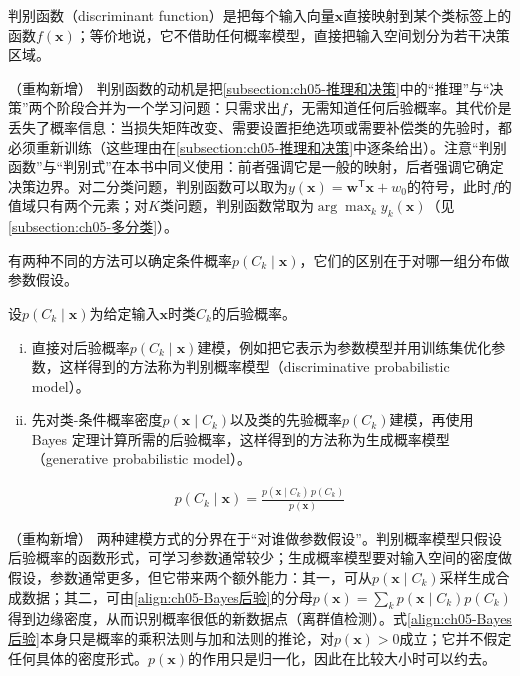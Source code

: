 \documentclass[../main.tex]{subfiles}
\begin{document}
\begin{definition}[判别函数]\label{definition:ch05-判别函数}
判别函数（discriminant function）是把每个输入向量$\boldsymbol{x}$直接映射到某个类标签上的函数$f(\boldsymbol{x})$；等价地说，它不借助任何概率模型，直接把输入空间划分为若干决策区域。
\end{definition}

\begin{remark}（重构新增）
判别函数的动机是把\cref{subsection:ch05-推理和决策}中的“推理”与“决策”两个阶段合并为一个学习问题：只需求出$f$，无需知道任何后验概率。其代价是丢失了概率信息：当损失矩阵改变、需要设置拒绝选项或需要补偿类的先验时，都必须重新训练（这些理由在\cref{subsection:ch05-推理和决策}中逐条给出）。注意“判别函数”与“判别式”在本书中同义使用：前者强调它是一般的映射，后者强调它确定决策边界。对二分类问题，判别函数可以取为$y(\boldsymbol{x})=\boldsymbol{w}^{\mathsf{T}}\boldsymbol{x}+w_0$的符号，此时$f$的值域只有两个元素；对$K$类问题，判别函数常取为$\arg\max_k y_k(\boldsymbol{x})$（见\cref{subsection:ch05-多分类}）。
\end{remark}

有两种不同的方法可以确定条件概率$p(C_k\mid\boldsymbol{x})$，它们的区别在于对哪一组分布做参数假设。

\begin{definition}[判别概率模型与生成概率模型]\label{definition:ch05-生成与判别概率模型}
设$p(C_k\mid\boldsymbol{x})$为给定输入$\boldsymbol{x}$时类$C_k$的后验概率。
\begin{enumerate}[(i)]
  \item 直接对后验概率$p(C_k\mid\boldsymbol{x})$建模，例如把它表示为参数模型并用训练集优化参数，这样得到的方法称为判别概率模型（discriminative probabilistic model）。
  \item 先对类-条件概率密度$p(\boldsymbol{x}\mid C_k)$以及类的先验概率$p(C_k)$建模，再使用 Bayes 定理计算所需的后验概率，这样得到的方法称为生成概率模型（generative probabilistic model）。
\end{enumerate}
\end{definition}

\begin{align}
  p(C_k\mid\boldsymbol{x})=\frac{p(\boldsymbol{x}\mid C_k)\,p(C_k)}{p(\boldsymbol{x})}
  \label{align:ch05-Bayes后验}
\end{align}

\begin{remark}（重构新增）
两种建模方式的分界在于“对谁做参数假设”。判别概率模型只假设后验概率的函数形式，可学习参数通常较少；生成概率模型要对输入空间的密度做假设，参数通常更多，但它带来两个额外能力：其一，可从$p(\boldsymbol{x}\mid C_k)$采样生成合成数据；其二，可由\eqref{align:ch05-Bayes后验}的分母$p(\boldsymbol{x})=\sum_k p(\boldsymbol{x}\mid C_k)p(C_k)$得到边缘密度，从而识别概率很低的新数据点（离群值检测）。式\eqref{align:ch05-Bayes后验}本身只是概率的乘积法则与加和法则的推论，对$p(\boldsymbol{x})>0$成立；它并不假定任何具体的密度形式。$p(\boldsymbol{x})$的作用只是归一化，因此在比较大小时可以约去。
\end{remark}
\end{document}
